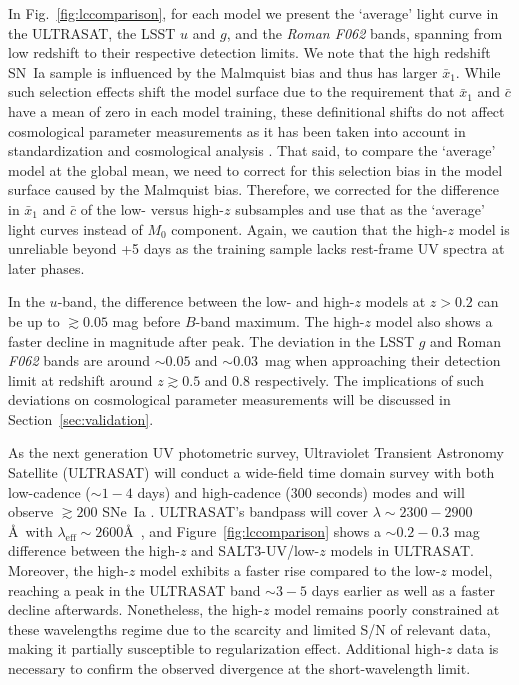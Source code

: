 \documentclass[twocolumn,tighten,times,floatfix]{aastex631}
\begin{document}
In Fig.~\ref{fig:lccomparison}, for each model we present the `average' light curve in the ULTRASAT, the LSST $u$ and $g$, and the {\it Roman F062} bands, spanning from low redshift to their respective detection limits. 
We note that the high redshift SN~Ia sample is influenced by the Malmquist bias and thus has larger $\bar x_1$. While such selection effects shift the model surface due to the requirement that $\bar x_1$ and $\bar c$ have a mean of zero in each model training, these definitional shifts do not affect cosmological parameter measurements as it has been taken into account in standardization and cosmological analysis \citep{Rubin16}. That said, to compare the `average' model at the global mean, we need to correct for this selection bias in the model surface caused by the Malmquist bias. Therefore, we corrected for the difference in $\bar x_1$ and $\bar c$ of the low- versus high-$z$ subsamples and use that as the `average' light curves instead of $M_0$ component.
Again, we caution that the high-$z$ model is unreliable beyond +5 days as the training sample lacks rest-frame UV spectra at later phases.


In the $u$-band, the difference between the low- and high-$z$ models at $z>0.2$ can be up to $\gtrsim0.05$ mag before $B$-band maximum. The high-$z$ model also shows a faster decline in magnitude after peak. The deviation in the LSST $g$ and Roman {\it F062} bands are around $\sim0.05$ and $\sim 0.03$~mag when approaching their detection limit at redshift around $z\gtrsim0.5$ and $0.8$ respectively. The implications of such deviations on cosmological parameter measurements will be discussed in Section~\ref{sec:validation}. 

As the next generation UV photometric survey, Ultraviolet Transient Astronomy Satellite (ULTRASAT) will conduct a wide-field time domain survey with both low-cadence ($\sim1-4$ days) and high-cadence ($300$ seconds) modes and will observe $\gtrsim200$ SNe~Ia \citep{ULTRASAT}. ULTRASAT's bandpass will cover $\lambda\sim 2300-2900$\AA\ with $\lambda_\textrm{eff} \sim 2600$\AA\ , and Figure~\ref{fig:lccomparison} shows a $\sim 0.2-0.3$ mag difference between the high-$z$ and SALT3-UV/low-$z$ models in ULTRASAT. Moreover, the high-$z$ model exhibits a faster rise compared to the low-$z$ model, reaching a peak in the ULTRASAT band $\sim 3-5$ days earlier as well as a faster decline afterwards. Nonetheless, the high-$z$ model remains poorly constrained at these wavelengths regime due to the scarcity and limited S/N of relevant data, making it partially susceptible to regularization effect. Additional high-$z$ data is necessary to confirm the observed divergence at the short-wavelength limit. 
\end{document}
